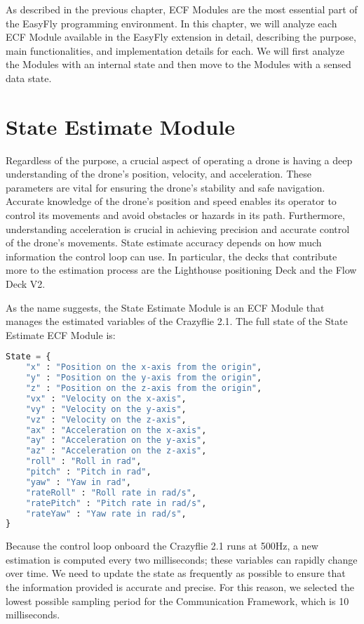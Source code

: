 As described in the previous chapter, ECF Modules are the most essential part of the EasyFly programming environment. 
In this chapter, we will analyze each ECF Module available in the EasyFly extension in detail, describing the purpose, main functionalities, and implementation details for each. 
We will first analyze the Modules with an internal state and then move to the Modules with a sensed data state. 

\section{State Estimate Module}\label{sec:module_state_estimate}

Regardless of the purpose, a crucial aspect of operating a drone is having a deep understanding of the drone's position, velocity, and acceleration. 
These parameters are vital for ensuring the drone's stability and safe navigation. 
Accurate knowledge of the drone's position and speed enables its operator to control its movements and avoid obstacles or hazards in its path. 
Furthermore, understanding acceleration is crucial in achieving precision and accurate control of the drone's movements.
State estimate accuracy depends on how much information the control loop can use. 
In particular, the decks that contribute more to the estimation process are the Lighthouse positioning Deck and the Flow Deck V2. 

As the name suggests, the State Estimate Module is an ECF Module that manages the estimated variables of the Crazyflie 2.1.
The full state of the State Estimate ECF Module is:
\begin{lstlisting}[language=Python]
State = {
    "x" : "Position on the x-axis from the origin",
    "y" : "Position on the y-axis from the origin",
    "z" : "Position on the z-axis from the origin",
    "vx" : "Velocity on the x-axis",
    "vy" : "Velocity on the y-axis",
    "vz" : "Velocity on the z-axis",
    "ax" : "Acceleration on the x-axis",
    "ay" : "Acceleration on the y-axis",
    "az" : "Acceleration on the z-axis",
    "roll" : "Roll in rad",
    "pitch" : "Pitch in rad",
    "yaw" : "Yaw in rad",
    "rateRoll" : "Roll rate in rad/s",
    "ratePitch" : "Pitch rate in rad/s",
    "rateYaw" : "Yaw rate in rad/s",
}
\end{lstlisting}

Because the control loop onboard the Crazyflie 2.1 runs at 500Hz, a new estimation is computed every two milliseconds; these variables can rapidly change over time. 
We need to update the state as frequently as possible to ensure that the information provided is accurate and precise. 
For this reason, we selected the lowest possible sampling period for the Communication Framework, which is 10 milliseconds.


